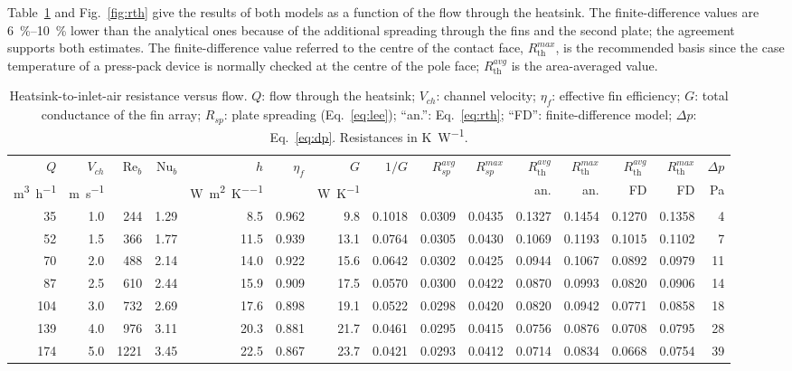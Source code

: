 \documentclass[11pt,a4paper]{article}
\newcommand{\Rth}{R_{\mathrm{th}}}
\begin{document}
Table~\ref{tab:sweep} and Fig.~\ref{fig:rth} give the results of both models as a function of the flow through the heatsink. The finite-difference values are \SIrange{6}{10}{\percent} lower than the analytical ones because of the additional spreading through the fins and the second plate; the agreement supports both estimates. The finite-difference value referred to the centre of the contact face, $\Rth^{max}$, is the recommended basis since the case temperature of a press-pack device is normally checked at the centre of the pole face; $\Rth^{avg}$ is the area-averaged value.

\begin{table}[htbp]
\centering\scriptsize
\setlength{\tabcolsep}{3.5pt}
\caption{Heatsink-to-inlet-air resistance versus flow. $Q$: flow through the heatsink; $V_{ch}$: channel velocity; $\eta_f$: effective fin efficiency; $G$: total conductance of the fin array; $R_{sp}$: plate spreading (Eq.~\ref{eq:lee}); ``an.'': Eq.~\eqref{eq:rth}; ``FD'': finite-difference model; $\Delta p$: Eq.~\eqref{eq:dp}. Resistances in \si{\kelvin\per\watt}.}
\label{tab:sweep}
\begin{tabular}{rrrrrrrrrrrrrrr}
\toprule
$Q$ & $V_{ch}$ & $\mathrm{Re}_b$ & $\mathrm{Nu}_b$ & $h$ & $\eta_f$ & $G$ & $1/G$ & $R_{sp}^{avg}$ & $R_{sp}^{max}$ & $\Rth^{avg}$ & $\Rth^{max}$ & $\Rth^{avg}$ & $\Rth^{max}$ & $\Delta p$ \\
\si{\cubic\metre\per\hour} & \si{\metre\per\second} & & & \si{\watt\per\metre\squared\per\kelvin} & & \si{\watt\per\kelvin} & & & & an. & an. & FD & FD & \si{\pascal} \\
\midrule
35 & 1.0 & 244 & 1.29 & 8.5 & 0.962 & 9.8 & 0.1018 & 0.0309 & 0.0435 & 0.1327 & 0.1454 & 0.1270 & 0.1358 & 4 \\
52 & 1.5 & 366 & 1.77 & 11.5 & 0.939 & 13.1 & 0.0764 & 0.0305 & 0.0430 & 0.1069 & 0.1193 & 0.1015 & 0.1102 & 7 \\
70 & 2.0 & 488 & 2.14 & 14.0 & 0.922 & 15.6 & 0.0642 & 0.0302 & 0.0425 & 0.0944 & 0.1067 & 0.0892 & 0.0979 & 11 \\
87 & 2.5 & 610 & 2.44 & 15.9 & 0.909 & 17.5 & 0.0570 & 0.0300 & 0.0422 & 0.0870 & 0.0993 & 0.0820 & 0.0906 & 14 \\
104 & 3.0 & 732 & 2.69 & 17.6 & 0.898 & 19.1 & 0.0522 & 0.0298 & 0.0420 & 0.0820 & 0.0942 & 0.0771 & 0.0858 & 18 \\
139 & 4.0 & 976 & 3.11 & 20.3 & 0.881 & 21.7 & 0.0461 & 0.0295 & 0.0415 & 0.0756 & 0.0876 & 0.0708 & 0.0795 & 28 \\
174 & 5.0 & 1221 & 3.45 & 22.5 & 0.867 & 23.7 & 0.0421 & 0.0293 & 0.0412 & 0.0714 & 0.0834 & 0.0668 & 0.0754 & 39 \\

\end{tabular}
\end{table}
\end{document}
